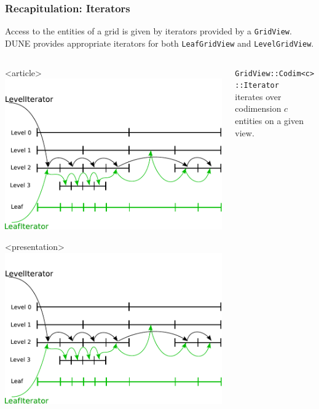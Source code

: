 \documentclass[aspectratio=169,11pt]{beamer}
\theoremstyle{definition}
\begin{document}
\begin{frame}
  \frametitle{Recapitulation: Iterators}
  Access to the entities of a grid is given by iterators provided by a \lstinline!GridView!. DUNE provides
  appropriate iterators for both \lstinline!LeafGridView! and \lstinline!LevelGridView!.
  \begin{columns}
    \begin{column}{0.47\linewidth}
      \begin{center}
        \begin{onlyenv}<article>
          \includegraphics[width=0.7\linewidth]{iterators}
        \end{onlyenv}
      \end{center}
      \begin{onlyenv}<presentation>
        \includegraphics[width=\linewidth]{iterators}
      \end{onlyenv}
    \end{column}
    \begin{column}{0.53\linewidth}
      \lstinline!GridView::Codim<c>::Iterator!\\ iterates over codimension
        $c$ entities on a given view.
    \end{column}
  \end{columns}
\end{frame}
\end{document}
